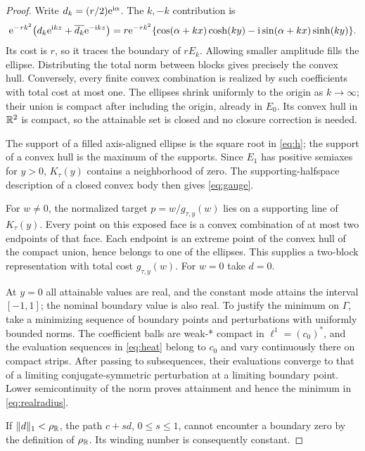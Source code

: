 \documentclass[11pt]{article}
\begin{document}
\begin{proof}
Write $d_k=(r/2)\mathrm e^{\mathrm i\alpha}$. The $k,-k$ contribution is
\begin{equation}
 \mathrm e^{-\tau k^2}\bigl(d_k\mathrm e^{\mathrm i kz}+\overline{d_k}\mathrm e^{-\mathrm i kz}\bigr)
 =r\mathrm e^{-\tau k^2}\{\cos(\alpha+kx)\cosh(ky)-\mathrm i\sin(\alpha+kx)\sinh(ky)\}.
\end{equation}
Its cost is $r$, so it traces the boundary of $rE_k$. Allowing smaller amplitude fills the ellipse. Distributing the total norm between blocks gives precisely the convex hull. Conversely, every finite convex combination is realized by such coefficients with total cost at most one. The ellipses shrink uniformly to the origin as $k\to\infty$; their union is compact after including the origin, already in $E_0$. Its convex hull in $\mathbb R^2$ is compact, so the attainable set is closed and no closure correction is needed.

The support of a filled axis-aligned ellipse is the square root in \eqref{eq:h}; the support of a convex hull is the maximum of the supports. Since $E_1$ has positive semiaxes for $y>0$, $K_\tau(y)$ contains a neighborhood of zero. The supporting-halfspace description of a closed convex body then gives \eqref{eq:gauge}.

For $w\ne0$, the normalized target $p=w/g_{\tau,y}(w)$ lies on a supporting line of $K_\tau(y)$. Every point on this exposed face is a convex combination of at most two endpoints of that face. Each endpoint is an extreme point of the convex hull of the compact union, hence belongs to one of the ellipses. This supplies a two-block representation with total cost $g_{\tau,y}(w)$. For $w=0$ take $d=0$.

At $y=0$ all attainable values are real, and the constant mode attains the interval $[-1,1]$; the nominal boundary value is also real. To justify the minimum on $\Gamma$, take a minimizing sequence of boundary points and perturbations with uniformly bounded norms. The coefficient balls are weak-* compact in $\ell^1=(c_0)^*$, and the evaluation sequences in \eqref{eq:heat} belong to $c_0$ and vary continuously there on compact strips. After passing to subsequences, their evaluations converge to that of a limiting conjugate-symmetric perturbation at a limiting boundary point. Lower semicontinuity of the norm proves attainment and hence the minimum in \eqref{eq:realradius}.

If $\|d\|_1<\rho_\mathbb R$, the path $c+sd$, $0\le s\le1$, cannot encounter a boundary zero by the definition of $\rho_\mathbb R$. Its winding number is consequently constant.\end{proof}
\end{document}
